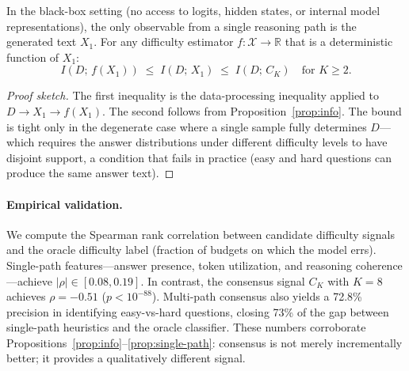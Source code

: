\begin{proposition}
\label{prop:single-path}
In the black-box setting (no access to logits, hidden states, or
internal model representations), the only observable from a single
reasoning path is the generated text $X_1$.
For any difficulty estimator $f\colon \mathcal{X} \to \mathbb{R}$
that is a deterministic function of $X_1$:
\begin{equation}
  I\!\left(D;\, f(X_1)\right) \;\le\; I\!\left(D;\, X_1\right)
  \;\le\; I\!\left(D;\, C_K\right) \quad \text{for } K \ge 2.
  \label{eq:single-path-bound}
\end{equation}
\end{proposition}

\begin{proof}[Proof sketch]
The first inequality is the data-processing inequality applied to
$D \to X_1 \to f(X_1)$.
The second follows from Proposition~\ref{prop:info}.
The bound is tight only in the degenerate case where a single sample
fully determines $D$---which requires the answer distributions under
different difficulty levels to have disjoint support, a condition that
fails in practice (easy and hard questions can produce the same answer
text).
\end{proof}

\paragraph{Empirical validation.}
We compute the Spearman rank correlation between candidate difficulty
signals and the oracle difficulty label (fraction of budgets on which
the model errs).
Single-path features---answer presence, token utilization, and reasoning
coherence---achieve $|\rho| \in [0.08, 0.19]$.
In contrast, the consensus signal $C_K$ with $K = 8$ achieves
$\rho = -0.51$ ($p < 10^{-88}$).
Multi-path consensus also yields a 72.8\% precision in identifying
easy-vs-hard questions, closing 73\% of the gap between single-path
heuristics and the oracle classifier.
These numbers corroborate Propositions~\ref{prop:info}--\ref{prop:single-path}:
consensus is not merely incrementally better; it provides a qualitatively
different signal.

